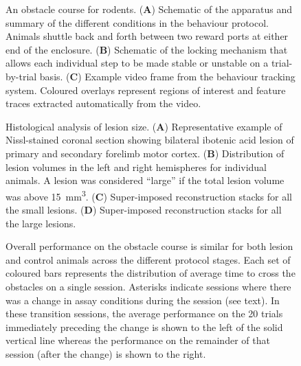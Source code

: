
\begin{figure}
\centering

\caption{An obstacle course for rodents. (\textbf{A}) Schematic of the apparatus and summary of the different conditions in the behaviour protocol. Animals shuttle back and forth between two reward ports at either end of the enclosure. (\textbf{B}) Schematic of the locking mechanism that allows each individual step to be made stable or unstable on a trial-by-trial basis. (\textbf{C}) Example video frame from the behaviour tracking system. Coloured overlays represent regions of interest and feature traces extracted automatically from the video.}
\label{fig:assay}
\end{figure}

\begin{figure}
\centering

\caption{Histological analysis of lesion size. (\textbf{A}) Representative example of Nissl-stained coronal section showing bilateral ibotenic acid lesion of primary and secondary forelimb motor cortex. (\textbf{B}) Distribution of lesion volumes in the left and right hemispheres for individual animals. A lesion was considered ``large'' if the total lesion volume was above \SI{15}{\milli\meter\cubed}. (\textbf{C}) Super-imposed reconstruction stacks for all the small lesions. (\textbf{D}) Super-imposed reconstruction stacks for all the large lesions.}
\label{fig:histology}
\end{figure}

\begin{figure}
\centering

\caption{Overall performance on the obstacle course is similar for both lesion and control animals across the different protocol stages. Each set of coloured bars represents the distribution of average time to cross the obstacles on a single session. Asterisks indicate sessions where there was a change in assay conditions during the session (see text). In these transition sessions, the average performance on the 20 trials immediately preceding the change is shown to the left of the solid vertical line whereas the performance on the remainder of that session (after the change) is shown to the right.}
\label{fig:learning}
\end{figure}

